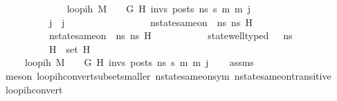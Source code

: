 \begin{isabellebody}
\ \ \ \isanewline
\ \ \ \ \ \ \ \ \ \ {\isachardoublequoteopen}loop{\isacharunderscore}{\kern0pt}ih\ M\ {\isasymLambda}\ {\isasymGamma}\ {\isasymOmega}\ G\ H{\isacharprime}{\kern0pt}\ invs\ posts\ ns{}\ s{\isacharprime}{\kern0pt}\ m\ m{\isacharprime}{\kern0pt}\ j{\isachardoublequoteclose}\ \isanewline
\ \ \ \ \ \ \ \ \ \ {\isachardoublequoteopen}j{\isacharprime}{\kern0pt}\ {\isasymle}\ j{\isachardoublequoteclose}\ \ \ \ \ \ \ \isanewline
\ \ \ \ \ \ \ \ \ \ {\isachardoublequoteopen}nstate{\isacharunderscore}{\kern0pt}same{\isacharunderscore}{\kern0pt}on\ {\isasymLambda}\ ns{}\ ns{}\ H{\isachardoublequoteclose}\ \isanewline
\ \ \ \ \ \ \ \ \ \ {\isachardoublequoteopen}nstate{\isacharunderscore}{\kern0pt}same{\isacharunderscore}{\kern0pt}on\ {\isasymLambda}\ ns{}\ ns{}\ H{\isachardoublequoteclose}\ \isanewline
\ \ \ \ \ \ \ \ \ \ {\isachardoublequoteopen}state{\isacharunderscore}{\kern0pt}well{\isacharunderscore}{\kern0pt}typed\ {\isasymLambda}\ {\isasymOmega}\ ns{}{\isachardoublequoteclose}\isanewline
\ \ \ \ \ \ \ \ \ \ {\isachardoublequoteopen}H\ {\isasymsubseteq}\ {\isacharparenleft}{\kern0pt}set\ H{\isacharprime}{\kern0pt}{\isacharparenright}{\kern0pt}{\isachardoublequoteclose}\ \ \ \ \ \ \ \ \ \ \isanewline
\ \ \ \ \ {\isachardoublequoteopen}loop{\isacharunderscore}{\kern0pt}ih\ M\ {\isasymLambda}\ {\isasymGamma}\ {\isasymOmega}\ G\ H{\isacharprime}{\kern0pt}\ invs\ posts\ ns{}\ s{\isacharprime}{\kern0pt}\ m\ m{\isacharprime}{\kern0pt}\ j{\isacharprime}{\kern0pt}{\isachardoublequoteclose}\isanewline
%
\isadelimproof
\ \ %
\endisadelimproof
%
\isatagproof
{}\isamarkupfalse%
\ assms\isanewline
\ \ \isamarkupfalse%
\ {\isacharparenleft}{\kern0pt}meson\ loop{\isacharunderscore}{\kern0pt}ih{\isacharunderscore}{\kern0pt}convert{\isacharunderscore}{\kern0pt}subset{\isacharunderscore}{\kern0pt}smaller\ nstate{\isacharunderscore}{\kern0pt}same{\isacharunderscore}{\kern0pt}on{\isacharunderscore}{\kern0pt}sym\ nstate{\isacharunderscore}{\kern0pt}same{\isacharunderscore}{\kern0pt}on{\isacharunderscore}{\kern0pt}transitive{\isacharparenright}{\kern0pt}%
\endisatagproof
{\isafoldproof}%
%
\isadelimproof
\isanewline
%
\endisadelimproof
\isanewline
{}\isamarkupfalse%
\ loop{\isacharunderscore}{\kern0pt}ih{\isacharunderscore}{\kern0pt}convert{\isacharunderscore}{\kern0pt}{}{\isacharcolon}{\kern0pt}\isanewline

\end{isabellebody}
